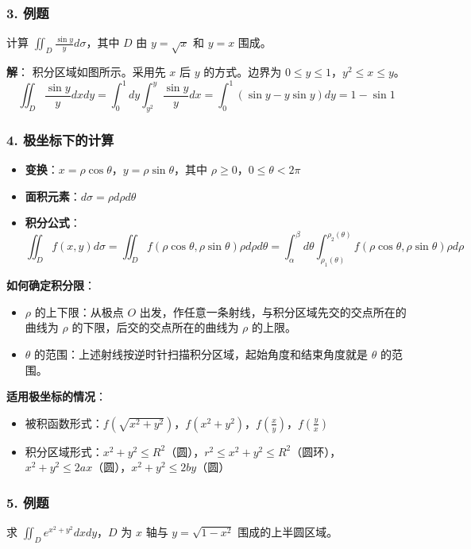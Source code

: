 \documentclass[12pt,a4paper]{ctexart}
\begin{document}
\subsubsection{3. 例题}
计算 $\iint_D \frac{\sin y}{y} d\sigma$，其中 $D$ 由 $y = \sqrt{x}$ 和 $y = x$ 围成。

\textbf{解}：
积分区域如图所示。采用先 $x$ 后 $y$ 的方式。边界为 $0 \le y \le 1$，$y^2 \le x \le y$。
\[
    \iint_D \frac{\sin y}{y} dx dy = \int_0^1 dy \int_{y^2}^{y} \frac{\sin y}{y} dx = \int_0^1 (\sin y - y \sin y) dy = 1 - \sin 1
\]

\subsubsection{4. 极坐标下的计算}
\begin{itemize}[noitemsep]
    \item \textbf{变换}：$x = \rho \cos \theta$，$y = \rho \sin \theta$，其中 $\rho \ge 0$，$0 \le \theta < 2\pi$
    \item \textbf{面积元素}：$d\sigma = \rho d\rho d\theta$
    \item \textbf{积分公式}：
          \[
              \iint_D f(x,y) d\sigma = \iint_D f(\rho \cos \theta, \rho \sin \theta) \rho d\rho d\theta = \int_\alpha^\beta d\theta \int_{\rho_1(\theta)}^{\rho_2(\theta)} f(\rho \cos \theta, \rho \sin \theta) \rho d\rho
          \]
\end{itemize}

\textbf{如何确定积分限}：
\begin{itemize}[noitemsep]
    \item $\rho$ 的上下限：从极点 $O$ 出发，作任意一条射线，与积分区域先交的交点所在的曲线为 $\rho$ 的下限，后交的交点所在的曲线为 $\rho$ 的上限。
    \item $\theta$ 的范围：上述射线按逆时针扫描积分区域，起始角度和结束角度就是 $\theta$ 的范围。
\end{itemize}

\textbf{适用极坐标的情况}：
\begin{itemize}[noitemsep]
    \item 被积函数形式：$f(\sqrt{x^2+y^2})$，$f(x^2+y^2)$，$f(\frac{x}{y})$，$f(\frac{y}{x})$
    \item 积分区域形式：$x^2 + y^2 \le R^2$（圆），$r^2 \le x^2 + y^2 \le R^2$（圆环），$x^2 + y^2 \le 2ax$（圆），$x^2 + y^2 \le 2by$（圆）
\end{itemize}

\subsubsection{5. 例题}
求 $\iint_D e^{x^2 + y^2} dxdy$，$D$ 为 $x$ 轴与 $y = \sqrt{1 - x^2}$ 围成的上半圆区域。
\end{document}
